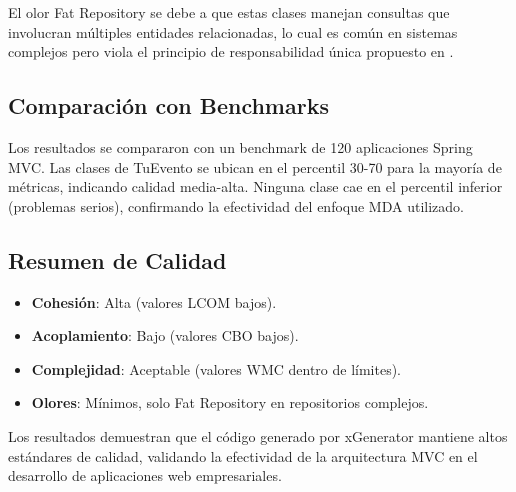 El olor Fat Repository se debe a que estas clases manejan consultas que involucran múltiples entidades relacionadas, lo cual es común en sistemas complejos pero viola el principio de responsabilidad única propuesto en \cite{aniche2018code}.

\subsection{Comparación con Benchmarks}
Los resultados se compararon con un benchmark de 120 aplicaciones Spring MVC. Las clases de TuEvento se ubican en el percentil 30-70 para la mayoría de métricas, indicando calidad media-alta. Ninguna clase cae en el percentil inferior (problemas serios), confirmando la efectividad del enfoque MDA utilizado.

\subsection{Resumen de Calidad}
\begin{itemize}
\item \textbf{Cohesión}: Alta (valores LCOM bajos).
\item \textbf{Acoplamiento}: Bajo (valores CBO bajos).
\item \textbf{Complejidad}: Aceptable (valores WMC dentro de límites).
\item \textbf{Olores}: Mínimos, solo Fat Repository en repositorios complejos.
\end{itemize}

Los resultados demuestran que el código generado por xGenerator mantiene altos estándares de calidad, validando la efectividad de la arquitectura MVC en el desarrollo de aplicaciones web empresariales.